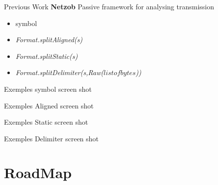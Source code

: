 \documentclass{beamer}
\newcounter{m} %
\newcounter{c} %
\begin{document}
\begin{frame}{Previous Work \textbf{Netzob}}
Passive framework for analysing transmission
\begin{itemize}
\item symbol
\item \textit{Format.splitAligned(s)}
\item \textit{Format.splitStatic(s)}
\item \textit{Format.splitDelimiter(s,Raw($listofbytes$))}
\end{itemize}


\end{frame}

\begin{frame}{Exemples}
symbol screen shot
\end{frame}

\begin{frame}{Exemples}
Aligned screen shot
\end{frame}

\begin{frame}{Exemples}
Static screen shot
\end{frame}

\begin{frame}{Exemples}
Delimiter screen shot
\end{frame}

\section{RoadMap}
\begin{frame}

	\tableofcontents[currentsection]
\end{frame}
\end{document}
